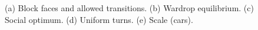 \begin{figure}
\hspace{0.1in}
\caption{(a) Block faces and allowed transitions. (b) Wardrop equilibrium.  (c) Social optimum.  (d) Uniform turns.  (e) Scale (cars).}
\label{fig:circles}
 \end{figure}



